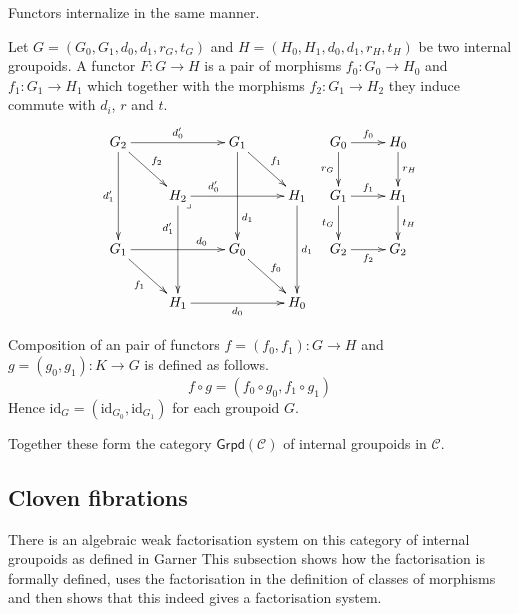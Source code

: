 \documentclass{amsart}
\theoremstyle{plain}
\theoremstyle{definition}
\newcommand\hide[1]{}
\newcommand\cat\mathcal
\newcommand\id{\mathrm{id}}
\begin{document}
Functors internalize in the same manner.

Let $G=(G_0,G_1,d_0,d_1,r_G,t_G)$ and $H=(H_0,H_1,d_0,d_1,r_H,t_H)$ be two internal groupoids. A functor $F:G\to H$ is a pair of morphisms $f_0:G_0 \to H_0$ and $f_1:G_1 \to H_1$ which together with the morphisms $f_2:G_1 \to H_2$ they induce commute with $d_i$, $r$ and $t$. 
\[ \xymatrix{
G_2 \ar[rr]^{d'_0}\ar[dd]_{d'_1} \ar[dr]^{f_2} && G_1 \ar[dr]^{f_1}\ar[dd]^(.7){d_1} \\
& H_2 \ar[rr]^(.3){d'_0}\ar[dd]_(.3){d'_1} \ar@{}[dr]|<\lrcorner && H_1\ar[dd]^{d_1}\\
G_1 \ar[rr]^(.7){d_0} \ar[dr]_{f_1} && G_0 \ar[dr]^{f_0} \\
&H_1 \ar[rr]_{d_0} && H_0
} \xymatrix{
G_0 \ar[r]^{f_0}\ar[d]_{r_G} & H_0 \ar[d]^{r_H}\\
G_1 \ar[r]^{f_1}\ar[d]_{t_G} & H_1 \ar[d]^{t_H}\\
G_2 \ar[r]_{f_2} & G_2}\]

Composition of an pair of functors $f=(f_0,f_1):G\to H$ and $g = (g_0,g_1):K\to G$ is defined as follows.
\[f\circ g = (f_0\circ g_0,f_1\circ g_1)\]
Hence $\id_G = (\id_{G_0}, \id_{G_1})$ for each groupoid $G$.

\newcommand\grpd{\mathsf{Grpd}}
Together these form the category $\grpd(\cat C)$ of internal groupoids in $\cat C$.

\hide{potential advantages of set builder}

\hide{Some properties, like closure under limits and colimits?
Refer to what sources for this?
}

\subsection{Cloven fibrations}
There is an algebraic weak factorisation system on this category of internal groupoids as defined in Garner%
This subsection shows how the factorisation is formally defined, uses the factorisation in the definition of classes of morphisms and then shows that this indeed gives a factorisation system.
\end{document}
